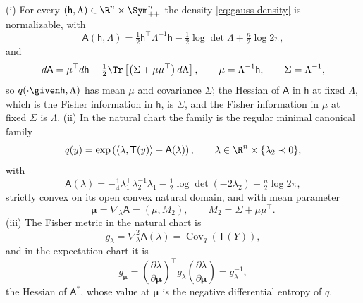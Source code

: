 (i) For every \((\mathsf h,\Lambda)\in\R^n\times\Sym_{++}^n\) the density
\eqref{eq:gauss-density} is normalizable, with
\begin{equation}
\mathsf A(\mathsf h,\Lambda)
=\tfrac12\mathsf h^\top\Lambda^{-1}\mathsf h-\tfrac12\log\det\Lambda+\tfrac n2\log2\pi,
\label{eq:gauss-lognorm}
\end{equation}
and
\begin{equation}
d\mathsf A=\mu^\top d\mathsf h-\tfrac12\Tr\left[\left(\Sigma+\mu\mu^\top\right)d\Lambda\right],
\qquad
\mu=\Lambda^{-1}\mathsf h,
\qquad
\Sigma=\Lambda^{-1},
\label{eq:gauss-moments}
\end{equation}
so \(q(\cdot\given\mathsf h,\Lambda)\) has mean \(\mu\) and covariance
\(\Sigma\); the Hessian of \(\mathsf A\) in \(\mathsf h\) at fixed
\(\Lambda\), which is the Fisher information in \(\mathsf h\), is \(\Sigma\),
and the Fisher information in \(\mu\) at fixed \(\Sigma\) is \(\Lambda\).
(ii) In the natural chart the family is the regular
minimal canonical family
\begin{equation}
q(y)=\exp\left(\langle\lambda,\mathsf T(y)\rangle-\mathsf A(\lambda)\right),
\qquad \lambda\in\R^n\times\{\lambda_2\prec0\},
\label{eq:ig-density}
\end{equation}
with
\begin{equation}
\mathsf A(\lambda)
=-\tfrac14\lambda_1^\top\lambda_2^{-1}\lambda_1-\tfrac12\log\det(-2\lambda_2)+\tfrac n2\log2\pi,
\label{eq:ig-lognormalizer}
\end{equation}
strictly convex on its open convex natural domain, and with mean parameter
\begin{equation}
\boldsymbol\mu=\nabla_\lambda\mathsf A=\left(\mu,M_2\right),
\qquad M_2=\Sigma+\mu\mu^\top.
\label{eq:ig-expectation}
\end{equation}
(iii) The Fisher metric in the natural chart is
\begin{equation}
g_\lambda=\nabla^2_\lambda\mathsf A(\lambda)=\operatorname{Cov}_q\left(\mathsf T(Y)\right),
\label{eq:ig-fisher-hessian}
\end{equation}
and in the expectation chart it is
\begin{equation}
g_{\boldsymbol\mu}
=\left(\frac{\partial\lambda}{\partial\boldsymbol\mu}\right)^{\top}g_\lambda
\left(\frac{\partial\lambda}{\partial\boldsymbol\mu}\right)
=g_\lambda^{-1},
\label{eq:ig-dual-inverse}
\end{equation}
the Hessian of \(\mathsf A^\ast\), whose value at \(\boldsymbol\mu\) is the
negative differential entropy of \(q\). 

